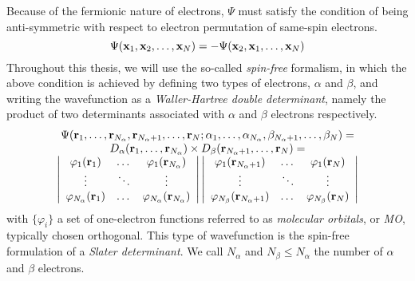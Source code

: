 \documentclass[./thesis.tex]{subfiles}
\begin{document}
Because of the fermionic nature of electrons, $\Psi$ must satisfy the condition of being anti-symmetric with respect to electron permutation of same-spin electrons.
\begin{equation}
\Psi({\bf x}_1, {\bf x}_2,\dots,{\bf x}_N) = -\Psi({\bf x}_2, {\bf x}_1,\dots,{\bf x}_N)
\end{equation}
Throughout this thesis, we will use the so-called \emph{spin-free} formalism, in which the above condition is achieved by defining two types of electrons, $\alpha$ and $\beta$, and writing the wavefunction as a \emph{Waller-Hartree double determinant},\cite{Pauncz_1989} namely the product of two determinants associated with $\alpha$ and $\beta$ electrons respectively.
\begin{equation}
\begin{array}{c}
 \Psi({\bf r}_1,\dots,{\bf r}_{{N_\alpha}},{\bf r}_{{N_\alpha}+1},\dots,{\bf r}_N;
      \alpha_1,\dots,\alpha_{{N_\alpha}},\beta_{{N_\alpha}+1},\dots,\beta_N) = \\
D_\alpha({\bf r}_1,\dots,{\bf r}_{{N_\alpha}}) \times D_\beta({\bf r}_{{N_\alpha}+1},\dots,{\bf r}_N) = \\
\left|
 \begin{array}{ccc}
 \varphi_1({\bf r}_1) & \dots & \varphi_1({\bf r}_{{N_\alpha}}) \\
 \vdots               & \ddots &   \vdots             \\
 \varphi_{{N_\alpha}}({\bf r}_1) & \dots & \varphi_{{N_\alpha}}({\bf r}_{{N_\alpha}}) \\
 \end{array}
\right|
\left|
 \begin{array}{ccc}
 \varphi_1({\bf r}_{{N_\alpha}+1}) & \dots & \varphi_1({\bf r}_{N}) \\
 \vdots               & \ddots &   \vdots             \\
 \varphi_{N_\beta}({\bf r}_{{N_\alpha}+1}) & \dots & \varphi_{N_\beta}({\bf r}_{N}) \\
 \end{array}
\right| \\ 
\end{array} \\
\label{eq:slater}
\end{equation}
with $\{ \varphi_i \}$ a set of one-electron functions referred to as \emph{molecular orbitals}, or \emph{MO}, typically chosen orthogonal. This type of wavefunction is the spin-free formulation of a \emph{Slater determinant}. We call $N_\alpha$ and $N_\beta \leq N_\alpha$ the number of $\alpha$ and $\beta$ electrons.
\end{document}
